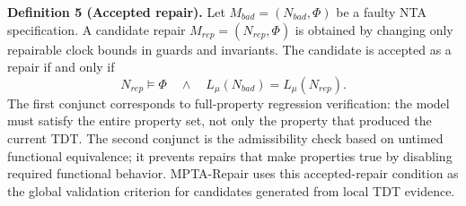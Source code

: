 \noindent\textbf{Definition 5 (Accepted repair).}
Let $M_{\mathit{bad}}=(N_{\mathit{bad}},\Phi)$ be
a faulty NTA specification. A candidate repair
$M_{\mathit{rep}}=(N_{\mathit{rep}},\Phi)$ is obtained by changing only
repairable clock bounds in guards and invariants. The candidate is
accepted as a repair if and only if
\begin{equation}
  N_{\mathit{rep}}
  \models
  \Phi
  \quad\land\quad
  L_\mu(N_{\mathit{bad}})
  =
  L_\mu(N_{\mathit{rep}}).
  \label{eq:accepted-repair}
\end{equation}
The first conjunct corresponds to full-property regression verification:
the model must satisfy the entire property set, not only the
property that produced the current TDT. The second conjunct is the
admissibility check based on untimed functional equivalence; it prevents
repairs that make properties true by disabling required functional
behavior. MPTA-Repair uses this accepted-repair condition as the global
validation criterion for candidates generated from local TDT evidence.
